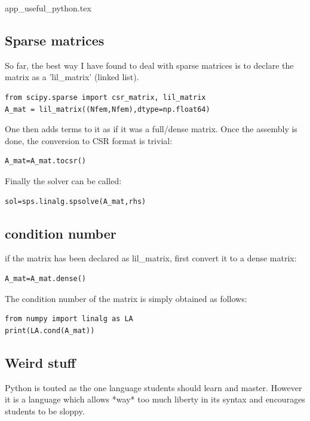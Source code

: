 \begin{flushright} {\tiny {\color{gray} app\_useful\_python.tex}} \end{flushright}

\subsection{Sparse matrices}

So far, the best way I have found to deal with sparse matrices is to 
declare the matrix as a 'lil\_matrix' (linked list).

\begin{lstlisting}
from scipy.sparse import csr_matrix, lil_matrix
A_mat = lil_matrix((Nfem,Nfem),dtype=np.float64)
\end{lstlisting}

One then adds terms to it as if it was a full/dense matrix. 
Once the assembly is done, the conversion to CSR format is trivial:

\begin{lstlisting}
A_mat=A_mat.tocsr()
\end{lstlisting}

Finally the solver can be called:

\begin{lstlisting}
sol=sps.linalg.spsolve(A_mat,rhs)
\end{lstlisting}

\subsection{condition number}

if the matrix has been declared as lil\_matrix, first convert it to a dense matrix:
\begin{lstlisting}
A_mat=A_mat.dense()
\end{lstlisting}
The condition number of the matrix is simply obtained as follows:
\begin{lstlisting}
from numpy import linalg as LA
print(LA.cond(A_mat))
\end{lstlisting}

\subsection{Weird stuff}

Python is touted as the one language students should learn 
and master. However it is a language which allows *way* too 
much liberty in its syntax and encourages students to be sloppy. 

